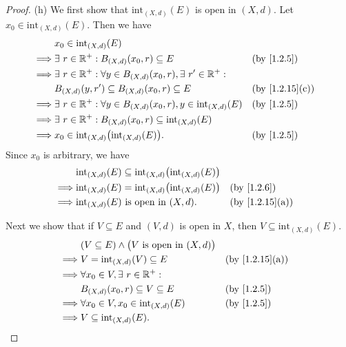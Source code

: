 \begin{proof}{(h)}
  We first show that \(\text{int}_{(X, d)}(E)\) is open in \((X, d)\).
  Let \(x_0 \in \text{int}_{(X, d)}(E)\).
  Then we have
  \begin{align*}
             & x_0 \in \text{int}_{(X, d)}(E)                                                                                         \\
    \implies & \exists\ r \in \R^+ : B_{(X, d)}(x_0, r) \subseteq E                                 &  & \text{(by \cref{1.2.5})}     \\
    \implies & \exists\ r \in \R^+ : \forall y \in B_{(X, d)}(x_0, r), \exists\ r' \in \R^+ :                                         \\
             & B_{(X, d)}(y, r') \subseteq B_{(X, d)}(x_0, r) \subseteq E                           &  & \text{(by \cref{1.2.15}(c))} \\
    \implies & \exists\ r \in \R^+ : \forall y \in B_{(X, d)}(x_0, r), y \in \text{int}_{(X, d)}(E) &  & \text{(by \cref{1.2.5})}     \\
    \implies & \exists\ r \in \R^+ : B_{(X, d)}(x_0, r) \subseteq \text{int}_{(X, d)}(E)                                              \\
    \implies & x_0 \in \text{int}_{(X, d)}\big(\text{int}_{(X, d)}(E)\big).                         &  & \text{(by \cref{1.2.5})}
  \end{align*}
  Since \(x_0\) is arbitrary, we have
  \begin{align*}
             & \text{int}_{(X, d)}(E) \subseteq \text{int}_{(X, d)}\big(\text{int}_{(X, d)}(E)\big)                                   \\
    \implies & \text{int}_{(X, d)}(E) = \text{int}_{(X, d)}\big(\text{int}_{(X, d)}(E)\big)         &  & \text{(by \cref{1.2.6})}     \\
    \implies & \text{int}_{(X, d)}(E) \text{ is open in } (X, d).                                   &  & \text{(by \cref{1.2.15}(a))}
  \end{align*}

  Next we show that if \(V \subseteq E\) and \((V, d)\) is open in \(X\), then \(V \subseteq \text{int}_{(X, d)}(E)\).
  \begin{align*}
             & (V \subseteq E) \land \big(V \text{ is open in } (X, d)\big)                                   \\
    \implies & V = \text{int}_{(X, d)}(V) \subseteq E                       &  & \text{(by \cref{1.2.15}(a))} \\
    \implies & \forall x_0 \in V, \exists\ r \in \R^+ :                                                       \\
             & B_{(X, d)}(x_0, r) \subseteq V \subseteq E                   &  & \text{(by \cref{1.2.5})}     \\
    \implies & \forall x_0 \in V, x_0 \in \text{int}_{(X, d)}(E)            &  & \text{(by \cref{1.2.5})}     \\
    \implies & V \subseteq \text{int}_{(X, d)}(E).
  \end{align*}


\end{proof}
